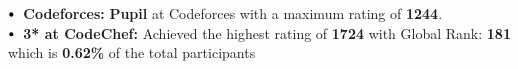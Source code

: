 \documentclass[letterpaper,11pt]{article}
\newcommand\sbullet[1][.5]{\mathbin{\vcenter{\hbox{\scalebox{#1}{$\bullet$}}}}}
\begin{document}
$\sbullet[.75] \hspace{0.1cm}$ 
\textbf{Codeforces:} \textbf{Pupil} at Codeforces with a maximum rating of \textbf{1244}. \\
$\sbullet[.75] \hspace{0.1cm}$ 
\textbf{3* at CodeChef:} Achieved the highest rating of \textbf{1724} with Global Rank: \textbf{181} which is \textbf{0.62\%} of the total participants\\

\vspace{-6pt}
 

\end{document}
